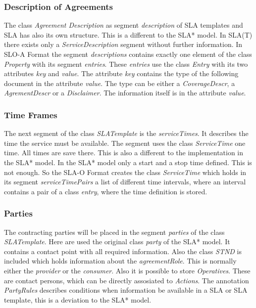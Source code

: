 \subsubsection{Description of Agreements}
The class {\it Agreement Description} as segment {\it description} of SLA templates and SLA has also its own structure. This is a different to the SLA* model. In SLA(T) there exists only a {\it ServiceDescription} segment without further information. In SLO-A Format the segment {\it descriptions} contains exactly one element of the class {\it Property} with its segment {\it entries}. These {\it entries} use the class {\it Entry} with its two attributes {\it key} and {\it value}. The attribute {\it key} contains the type of the following document in the attribute {\it value}. The type can be either a {\it CoverageDescr}, a {\it AgrementDescr} or a {\it Disclaimer}. The information itself is in the attribute {\it value}.

\subsubsection{Time Frames}
The next segment of the class {\it SLATemplate} is the {\it serviceTimes}. It describes the time the service must be available. The segment uses the class {\it ServiceTime} one time. All times are save there. This is also a different to the implementation in the SLA* model. In the SLA* model only a start and a stop time defined. This is not enough. So the SLA-O Format creates the class {\it ServiceTime} which holds in its segment {\it serviceTimePairs} a list of different time intervals, where an interval contains a pair of a class {\it entry}, where the time definition is stored.

\subsubsection{Parties}
The contracting parties will be placed in the segment {\it parties} of the class {\it SLATemplate}. Here are used the original class {\it party} of the SLA* model. It contains a contact point with all required information. Also the class {\it STND} is included which holds information about the {\it agreementRole}. This is normally either the {\it provider} or the {\it consumer}. Also it is possible to store {\it Operatives}. These are contact persons, which can be directly assosiated to {\it Actions}. The annotation {\it PartyRules} describes conditions when information be available in a SLA or SLA template, this is a deviation to the SLA* model.


